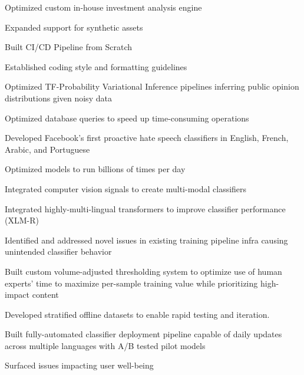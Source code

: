 \documentclass[]{resume}
\begin{document}
\begin{minipage}[t]{1.0\textwidth}
\begin{tightemize}
    \item Optimized custom in-house investment analysis engine
    \item Expanded support for synthetic assets 
    \columnbreak
    \item Built CI/CD Pipeline from Scratch
    \item Established coding style and formatting guidelines
\end{tightemize}


\begin{tightemize}
    \item Optimized TF-Probability Variational Inference pipelines inferring public opinion distributions given noisy data
    
    \columnbreak

    \item Optimized database queries to speed up time-consuming operations
    
\end{tightemize}

\begin{tightemize}
\item Developed Facebook's first proactive hate speech classifiers in English, French, Arabic, and Portuguese
\item Optimized models to run billions of times per day
\item Integrated computer vision signals to create multi-modal classifiers
\item Integrated highly-multi-lingual transformers to improve classifier performance (XLM-R)
\item Identified and addressed novel issues in existing training pipeline infra causing unintended classifier behavior

\columnbreak

\item Built custom volume-adjusted thresholding system to optimize use of human experts' time to maximize per-sample training value while prioritizing high-impact content
\item Developed stratified offline datasets to enable rapid testing and iteration.
\item Built fully-automated classifier deployment pipeline capable of daily updates 
across multiple languages with A/B tested pilot models
\item Surfaced issues impacting user well-being
\end{tightemize}


\end{minipage}
\end{document}
